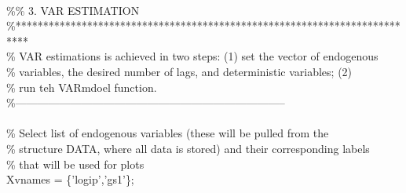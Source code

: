 \hspace{1mm}\hspace{5mm}  \\ 
\hspace{1mm}\hspace{5mm} \textcolor{matlabgreen}{\%}\textcolor{matlabgreen}{\% 3. VAR ESTIMATION }\\ 
\hspace{1mm}\hspace{5mm} \textcolor{matlabgreen}{\%**************************************************************************  }\\ 
\hspace{1mm}\hspace{5mm} \textcolor{matlabgreen}{\% VAR estimations is achieved in two steps: (1) set the vector of endogenous  }\\ 
\hspace{1mm}\hspace{5mm} \textcolor{matlabgreen}{\% variables, the desired number of lags, and deterministic variables; (2) }\\ 
\hspace{1mm}\hspace{5mm} \textcolor{matlabgreen}{\% run teh VARmdoel function. }\\ 
\hspace{1mm}\hspace{5mm} \textcolor{matlabgreen}{\%--------------------------------------------------------------------------  }\\ 
\hspace{1mm}\hspace{5mm}  \\ 
\hspace{1mm}\hspace{5mm} \textcolor{matlabgreen}{\% Select list of endogenous variables (these will be pulled from the  }\\ 
\hspace{1mm}\hspace{5mm} \textcolor{matlabgreen}{\% structure DATA, where all data is stored) and their corresponding labels  }\\ 
\hspace{1mm}\hspace{5mm} \textcolor{matlabgreen}{\% that will be used \textcolor{matlabblue}{for} plots }\\ 
\hspace{1mm}\hspace{5mm} \hspace{5mm} Xvnames      = \{\textcolor{matlabpurple}{'logip'},\textcolor{matlabpurple}{'gs1'}\}; \\ 
